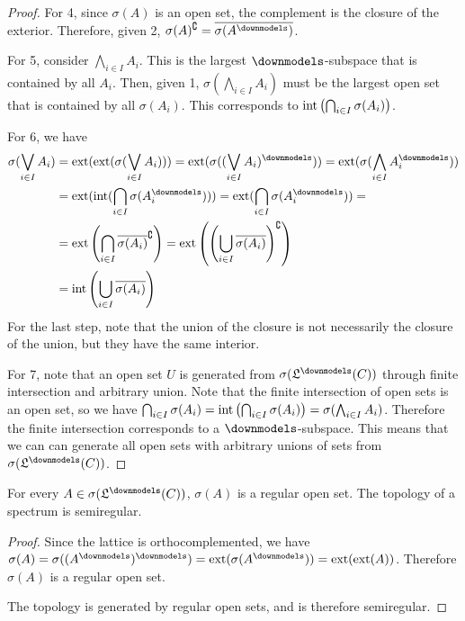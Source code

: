 \begin{mathSection}
\begin{proof}
		For 4, since $\sigma(A)$ is an open set, the complement is the closure of the exterior. Therefore, given 2, $\sigma(A)^{\complement} = \overline{\sigma(A^{\separate})}$.
		
		For 5, consider $\bigwedge_{i \in I} A_i$. This is the largest $\separate$-subspace that is contained by all $A_i$. Then, given 1, $\sigma\left(\bigwedge_{i \in I} A_i\right)$ must be the largest open set that is contained by all $\sigma(A_i)$. This corresponds to $\operatorname{int}\left(\bigcap_{i \in I} \sigma(A_i)\right)$.
		
		For 6, we have
		\begin{align*}
			\sigma(\bigvee_{i \in I} A_i) &= \exterior(\exterior(\sigma(\bigvee_{i \in I} A_i))) = \exterior(\sigma((\bigvee_{i \in I} A_i)^{\separate})) = \exterior(\sigma(\bigwedge_{i \in I} A_i^{\separate})) \\
			&= \exterior(\interior(\bigcap_{i \in I} \sigma(A_i^{\separate}))) = \exterior(\bigcap_{i \in I} \sigma(A_i^{\separate})) =  \\
			&= \exterior\left(\bigcap_{i \in I}\overline{\sigma(A_i)}^{\complement}\right) = \exterior\left(\left(\bigcup_{i \in I}\overline{\sigma(A_i)}\right)^{\complement}\right) \\
			&= \interior\left(\bigcup_{i \in I}\overline{\sigma(A_i)}\right)
		\end{align*}
		For the last step, note that the union of the closure is not necessarily the closure of the union, but they have the same interior.
		
		For 7, note that an open set $U$ is generated from $\sigma(\mathfrak{L}^\separate(C))$ through finite intersection and arbitrary union. Note that the finite intersection of open sets is an open set, so we have $\bigcap_{i \in I} \sigma(A_i) = \operatorname{int}\left(\bigcap_{i \in I} \sigma(A_i)\right) = \sigma(\bigwedge_{i \in I} A_i)$. Therefore the finite intersection corresponds to a $\separate$-subspace. This means that we can can generate all open sets with arbitrary unions of sets from $\sigma(\mathfrak{L}^\separate(C))$.
	\end{proof}
\end{mathSection}

\begin{coro}
	For every $A \in\sigma(\mathfrak{L}^\separate(C))$, $\sigma(A)$ is a regular open set. The topology of a spectrum is semiregular.
\end{coro}

\begin{proof}
	Since the lattice is orthocomplemented, we have $\sigma(A) = \sigma((A^{\separate})^{\separate}) = \exterior(\sigma(A^{\separate})) = \exterior(\exterior(A))$. Therefore $\sigma(A)$ is a regular open set.
	
	The topology is generated by regular open sets, and is therefore semiregular.
\end{proof}

